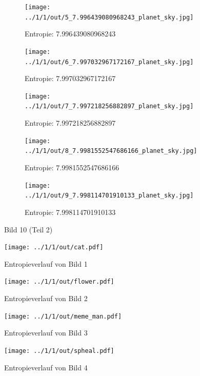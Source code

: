 \begin{figure}
	\centering

	\begin{subfigure}{0.25\textwidth}
		\texttt{[image: ../1/1/out/5\_7.996439080968243\_planet\_sky.jpg]}
		\caption{Entropie: 7.996439080968243}
	\end{subfigure}

	\begin{subfigure}{0.25\textwidth}
		\texttt{[image: ../1/1/out/6\_7.997032967172167\_planet\_sky.jpg]}
		\caption{Entropie: 7.997032967172167}
	\end{subfigure}

	\begin{subfigure}{0.25\textwidth}
		\texttt{[image: ../1/1/out/7\_7.997218256882897\_planet\_sky.jpg]}
		\caption{Entropie: 7.997218256882897}
	\end{subfigure}

	\begin{subfigure}{0.25\textwidth}
		\texttt{[image: ../1/1/out/8\_7.9981552547686166\_planet\_sky.jpg]}
		\caption{Entropie: 7.9981552547686166}
	\end{subfigure}

	\begin{subfigure}{0.25\textwidth}
		\texttt{[image: ../1/1/out/9\_7.998114701910133\_planet\_sky.jpg]}
		\caption{Entropie: 7.998114701910133}
	\end{subfigure}

	\caption{Bild 10 (Teil 2)}
	\label{end}
\end{figure}

\begin{figure}
	\centering
	\texttt{[image: ../1/1/out/cat.pdf]}
	\caption{Entropieverlauf von Bild 1}
	\label{plotstart}
\end{figure}

\begin{figure}
	\centering
	\texttt{[image: ../1/1/out/flower.pdf]}
	\caption{Entropieverlauf von Bild 2}
\end{figure}

\begin{figure}
	\centering
	\texttt{[image: ../1/1/out/meme\_man.pdf]}
	\caption{Entropieverlauf von Bild 3}
\end{figure}

\begin{figure}
	\centering
	\texttt{[image: ../1/1/out/spheal.pdf]}
	\caption{Entropieverlauf von Bild 4}
\end{figure}

